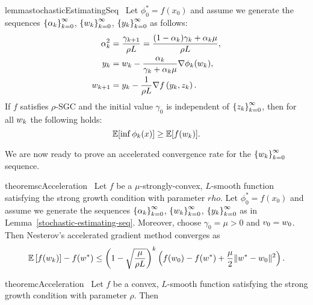 \begin{restatable}{lemma}{stochasticEstimatingSeq}~\label{lemma:stochastic-estimating-seq}
    Let \( \phi^*_0 = f(x_0) \) and assume we generate the sequences \( \left\{\alpha_k\right\}_{k=0}^\infty \), \( \left\{w_k\right\}_{k=0}^\infty \), \( \left\{y_k\right\}_{k=0}^\infty \) as follows:
    \begin{align*}
        \alpha^2_k &= \frac{\gamma_{k+1}}{\rho L } = \frac{(1-\alpha_k)\gamma_k + \alpha_k \mu}{\rho L}, \\
        y_k &= w_k - \frac{\alpha_k}{\gamma_k + \alpha_k \mu} \nabla \phi_k(w_k),\\
        w_{k+1} &= y_k - \frac{1}{\rho L} \nabla f\left(y_k, z_{k}\right).
    \end{align*}
    If \( f \) satisfies \( \rho \)-SGC and the initial value \( \gamma_0 \) is independent of \( \left\{z_{k}\right\}_{k=0}^\infty \), then for all \( w_k \) the following holds:
    \[ \mathbb{E} [\inf \phi_k(x)] \geq \mathbb{E} [f(w_k)]. \]
\end{restatable}


We are now ready to prove an accelerated convergence rate for the \( \left\{w_k\right\}_{k=0}^\infty \) sequence.\\

\begin{restatable}{theorem}{scAcceleration}~\label{thm:sc-acceleration}
    Let \( f \) be a \( \mu \)-strongly-convex, \( L \)-smooth function satisfying the strong growth condition with parameter \( rho \).
    Let \( \phi^*_0 = f(x_0) \) and assume we generate the sequences \( \left\{\alpha_k\right\}_{k=0}^\infty \), \( \left\{w_k\right\}_{k=0}^\infty \), \( \left\{y_k\right\}_{k=0}^\infty \) as in Lemma~\ref{stochastic-estimating-seq}.
    Moreover, choose \( \gamma_0 = \mu > 0 \) and \( v_0 = w_0 \).
    Then Nesterov's accelerated gradient method converges as  
    \[ \mathbb{E}\left[f(w_k)\right] - f(w^*) \leq \left(1 - \sqrt{\frac{\mu}{\rho L}}\right)^{k} \left( f(w_0) - f(w^*) + \frac{\mu}{2} \|w^* - w_0\|^2 \right).  \]
\end{restatable}

\begin{restatable}{theorem}{cAcceleration}~\label{thm:convex-acceleration}
    Let \( f \) be a convex, \( L \)-smooth function satisfying the strong growth condition with parameter \( \rho \).
    Then  
\end{restatable}

